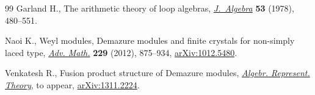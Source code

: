 \begin{thebibliography}{99}
Garland H., The arithmetic theory of loop algebras, \href{http://dx.doi.org/10.1016/0021-8693(78)90294-6}{\textit{J.~Algebra}}
  \textbf{53} (1978), 480--551.

Naoi K., Weyl modules, {D}emazure modules and f\/inite crystals for non-simply
  laced type, \href{http://dx.doi.org/10.1016/j.aim.2011.10.005}{\textit{Adv. Math.}} \textbf{229} (2012), 875--934,
  \href{http://arxiv.org/abs/1012.5480}{arXiv:1012.5480}.

Venkatesh R., Fusion product structure of Demazure modules, \href{http://dx.doi.org/10.1007/s10468-014-9495-6}{\textit{Algebr.
  Represent. Theory}}, {t}o appear, \href{http://arxiv.org/abs/1311.2224}{arXiv:1311.2224}.

\end{thebibliography}
